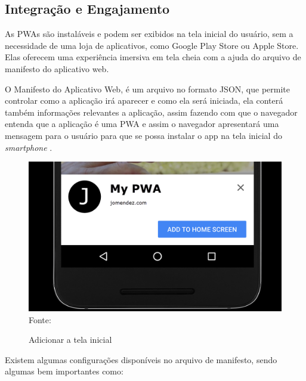 \subsection{Integração e Engajamento}

As \ac{PWA}s são instaláveis e podem ser exibidos na tela inicial do usuário, sem a necessidade de uma loja de aplicativos, como Google Play Store ou Apple Store. Elas oferecem uma experiência imersiva em tela cheia com a ajuda do arquivo de manifesto do aplicativo web.

O Manifesto do Aplicativo Web, é um arquivo no formato \ac{JSON}, que permite controlar como a aplicação irá aparecer e como ela será iniciada, ela conterá também informações relevantes a aplicação, assim fazendo com que o navegador entenda que a aplicação é uma \ac{PWA} e assim o navegador apresentará uma mensagem para o usuário para que se possa instalar o app na tela inicial do \textit{smartphone} \cite{manifest}.

\begin{figure}[!htpb]
	\centering
	\caption{Adicionar a tela inicial}
	\includegraphics[width=12cm]{images/add-to-home-screen.png}\\
    Fonte:\cite{pwaHomeScreen}
 	\label{f_c4_add_home}
\end{figure}

Existem algumas configurações disponíveis no arquivo de manifesto, sendo algumas bem importantes como:

